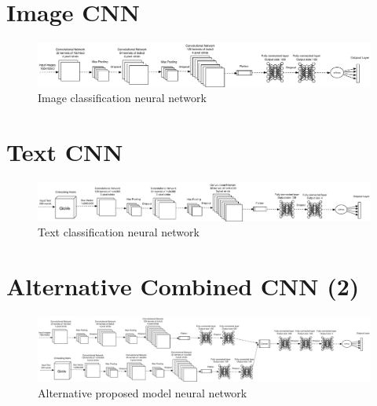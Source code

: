 \documentclass{article} %
\begin{document}
\begin{appendices}

\section{Image CNN}
    \begin{figure}[!htb]
\centering
        \includegraphics[totalheight=2cm]{CNN_PNG}
    \caption{Image classification neural network}
    \label{fig:CNN_PNG}
\end{figure}

\section{Text CNN}

    \begin{figure}[!htb]
\centering
        \includegraphics[totalheight=2cm]{HTML_PNG}
    \caption{Text classification neural network}
    \label{fig:HTML_PNG}
\end{figure}

\section{Alternative Combined CNN (2)}
    \begin{figure}[!htb]
\centering
        \includegraphics[totalheight=3cm]{Combined2}
    \caption{Alternative proposed model neural network}
    \label{fig:Combined_2}
\end{figure}


\end{appendices}
\end{document}
